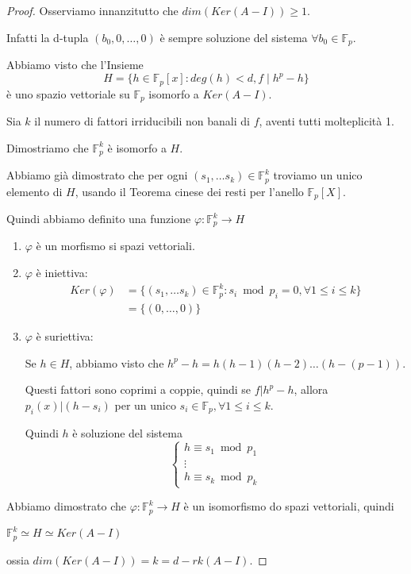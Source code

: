 \documentclass[../main.tex]{subfiles}
\begin{document}
\begin{proof}
    Osserviamo innanzitutto che $dim(Ker(A - I)) \geq 1$.

    Infatti la d-tupla $(b_0, 0 , \ldots, 0)$ è sempre soluzione del sistema $\forall b_0 \in \mathbb{F}_p$.

    Abbiamo visto che l'Insieme
    \begin{equation*}
        H = \{ h \in \mathbb{F}_p[x] : deg (h) < d, f \mid h^p - h\}
    \end{equation*}
    è uno spazio vettoriale su $\mathbb{F}_p$ isomorfo a $Ker(A - I)$.

    Sia $k$ il numero di fattori irriducibili non banali di $f$, aventi tutti molteplicità 1.

    Dimostriamo che $\mathbb{F}_p^k$ è isomorfo a $H$.

    Abbiamo già dimostrato che per ogni $(s_1, \ldots s_k) \in \mathbb{F}_p^k$ troviamo un unico elemento di $H$, usando il Teorema cinese dei resti per l'anello $\mathbb{F}_p[X]$.

    Quindi abbiamo definito una funzione $\varphi : \mathbb{F}_p^k \rightarrow H$
    \begin{enumerate}[label=\alph*)]
        \item $\varphi$ è un morfismo si spazi vettoriali.
        \item $\varphi$ è iniettiva:
              \begin{align*}
                  Ker(\varphi) & = \{(s_1, \ldots s_k) \in \mathbb{F}_p^k : s_i \bmod p_i = 0, \forall 1 \leq i \leq k\} \\
                               & =\{(0, \ldots , 0)\}
              \end{align*}

        \item $\varphi$ è suriettiva:

              Se $h \in H$, abbiamo visto che $h^p - h = h (h - 1)(h - 2)\ldots(h - (p - 1))$.

              Questi fattori sono coprimi a coppie, quindi se $f | h^p - h$, allora $p_i(x) | (h - s_i)$ per un unico $s_i \in \mathbb{F}_p, \forall 1 \leq i \leq k$.

              Quindi $h$ è soluzione del sistema
              \begin{equation*}
                  \begin{cases}
                      h \equiv s_1 \bmod p_1 \\
                      \vdots                 \\
                      h \equiv s_k \bmod p_k
                  \end{cases}
              \end{equation*}
    \end{enumerate}
    Abbiamo dimostrato che $\varphi : \mathbb{F}_p^k \rightarrow H $ è un isomorfismo do spazi vettoriali, quindi
    \begin{center}
        $\mathbb{F}_p^k \simeq H \simeq Ker(A - I)$
    \end{center}
    ossia $dim(Ker(A - I)) = k = d - rk(A - I)$.
\end{proof}
\end{document}
